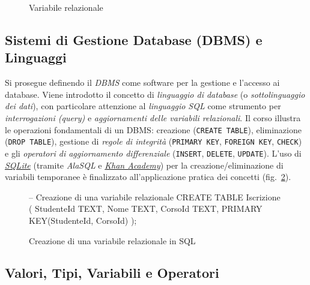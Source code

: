 \documentclass[withtimes]{easychair}
\theoremstyle{definition}
\begin{document}
\begin{figure}
    \centering
    
    \caption{Variabile relazionale\label{fig:variabile}}
\end{figure}

\subsection{Sistemi di Gestione Database (DBMS) e Linguaggi}\label{sistemi-di-gestione-database-dbms-e-linguaggi}

Si prosegue definendo il \emph{DBMS} come software per la gestione e l'accesso ai database. Viene introdotto il concetto di \emph{linguaggio di database} (o \emph{sottolinguaggio dei dati}), con particolare attenzione al \emph{linguaggio SQL} come strumento per \emph{interrogazioni (query)} e \emph{aggiornamenti delle variabili relazionali}. Il corso illustra le operazioni fondamentali di un DBMS: creazione (\texttt{CREATE\ TABLE}), eliminazione (\texttt{DROP\ TABLE}), gestione di \emph{regole di integrità} (\texttt{PRIMARY\ KEY}, \texttt{FOREIGN\ KEY}, \texttt{CHECK}) e gli \emph{operatori di aggiornamento differenziale} (\texttt{INSERT}, \texttt{DELETE}, \texttt{UPDATE}). L'uso di \href{https://sqlite.org/}{\emph{SQLite}} (tramite  \emph{AlaSQL} e \href{https://it.khanacademy.org/computer-programming/new/sql}{\emph{Khan Academy}}) per la creazione/eliminazione di variabili temporanee è finalizzato all'applicazione pratica dei concetti (fig.~\ref{fig:sql-create-instance}).


\begin{figure}[ht]
  \centering
  \begin{pygmented}[lang=sql]
-- Creazione di una variabile relazionale
CREATE TABLE Iscrizione (
  StudenteId TEXT,
  Nome TEXT,
  CorsoId TEXT,
  PRIMARY KEY(StudenteId, CorsoId)
);
  \end{pygmented}
  \caption{Creazione di una variabile relazionale in SQL}
  \label{fig:sql-create-instance}
\end{figure}


\subsection{Valori, Tipi, Variabili e Operatori}\label{valori-tipi-variabili-e-operatori}
\end{document}
